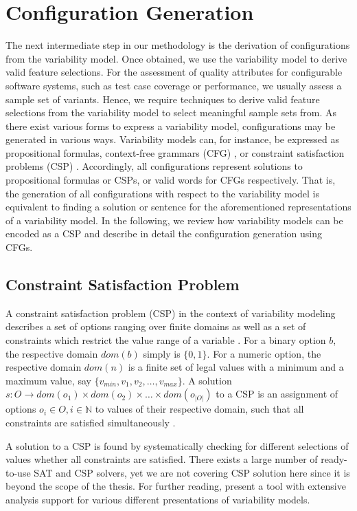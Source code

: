 \section{Configuration Generation}\label{sec:configuration_gen}
The next intermediate step in our methodology is the derivation of
configurations from the variability model. Once obtained, we use the
variability model to derive valid feature selections. For the assessment of
quality attributes for configurable software systems, such as test case
coverage or performance, we usually assess a sample set of variants. Hence, we
require techniques to derive valid feature selections from the variability
model to select meaningful sample sets from. As there exist various forms to
express a variability model, configurations may be generated in various ways.
Variability models can, for instance, be expressed as propositional formulas,
context-free grammars (CFG) \citep{batory_feature_2005}, or constraint
satisfaction problems (CSP)
\citep{benavides_automated_2005,benavides_using_2005}. Accordingly, all configurations represent solutions to propositional formulas or CSPs, or valid words for CFGs
respectively. That is, the generation of all configurations with respect to the
variability model is equivalent to finding a solution or sentence for the
aforementioned representations of a variability model. In the following, we
review how variability models can be encoded as a CSP and describe in detail
the configuration generation using CFGs.

\subsection{Constraint Satisfaction Problem}
A constraint satisfaction problem (CSP) in the context of variability modeling
describes a set of options ranging over finite domains as well as a set of
constraints which restrict the value range of a variable
\citep{benavides_automated_2005}. For a binary option $b$, the respective domain $dom(b)$ simply is $\lbrace 0, 1\rbrace$.
For a numeric option, the respective domain $dom(n)$ is a finite set of legal
values with a minimum and a maximum value, say $\lbrace v_{min}, v_1,
v_2, \ldots, v_{max}\rbrace$.
A solution $s: O \rightarrow dom(o_1) \times dom(o_2) \times \ldots \times
dom(o_{|O|})$ to a CSP is an assignment of options $o_i \in O, i \in \mathbb{N}$
to values of their respective domain, such that all constraints are satisfied simultaneously \citep{benavides_automated_2005}.  

A solution to a CSP is found by systematically checking for different
selections of values whether all constraints are satisfied. There exists a
large number of ready-to-use SAT and CSP solvers, yet we are not covering CSP
solution here since it is beyond the scope of the thesis. For further reading, 
\citep{benavides_fama:_2007} present a tool with extensive analysis support for
various different presentations of variability models.

